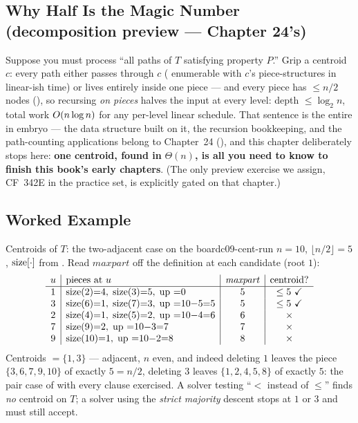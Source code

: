 \subsection{Why Half Is the Magic Number (decomposition preview --- Chapter 24's)}

Suppose you must process ``all paths of $T$ satisfying property $P$.'' Grip a centroid
$c$: every path either passes through $c$ ( enumerable with $c$'s piece-structures in
linear-ish time) or lives entirely inside one piece --- and every piece has
$\le n/2$ nodes (), so recursing \emph{on pieces} halves the input
at every level: depth $\le \log_2 n$, total work $O(n \log n)$ for any per-level
linear schedule. That sentence is the entire  in embryo ---
the data structure built on it, the recursion bookkeeping, and the path-counting
applications belong to Chapter~24 (), and this chapter deliberately stops
here: \textbf{one centroid, found in }$\Theta(n)$\textbf{, is all you need to know to
finish this book's early chapters}. (The only preview exercise we assign, CF~342E in
the practice set, is explicitly gated on that chapter.)

\subsection{Worked Example}

\begin{example}{Centroids of $T$: the two-adjacent case on the board}{c09-cent-run}
$n = 10$, $\lfloor n/2 \rfloor = 5$, $\operatorname{size}[\cdot]$ from . Read
$\mathit{maxpart}$ off the definition at each candidate (root $1$):
\[
\begin{array}{c|l|c|c}
u & \text{pieces at } u & \mathit{maxpart} & \text{centroid?} \\
\hline
1 & \operatorname{size}(2){=}4,\; \operatorname{size}(3){=}5,\; \text{up }{=}0 & 5 & \le 5\ \checkmark \\
3 & \operatorname{size}(6){=}1,\; \operatorname{size}(7){=}3,\; \text{up }{=}10{-}5{=}5 & 5 & \le 5\ \checkmark \\
2 & \operatorname{size}(4){=}1,\; \operatorname{size}(5){=}2,\; \text{up }{=}10{-}4{=}6 & 6 & \times \\
7 & \operatorname{size}(9){=}2,\; \text{up }{=}10{-}3{=}7 & 7 & \times \\
9 & \operatorname{size}(10){=}1,\; \text{up }{=}10{-}2{=}8 & 8 & \times
\end{array}
\]
Centroids $=\{1,3\}$ --- adjacent, $n$ even, and indeed deleting $1$ leaves the piece
$\{3,6,7,9,10\}$ of exactly $5 = n/2$, deleting $3$ leaves $\{1,2,4,5,8\}$ of exactly
$5$: the pair case of  with every clause exercised. A solver
testing ``$<$ instead of $\le$'' finds \emph{no} centroid on $T$; a solver using the
\emph{strict majority} descent stops at $1$ or $3$ and must still accept. \end{example}

